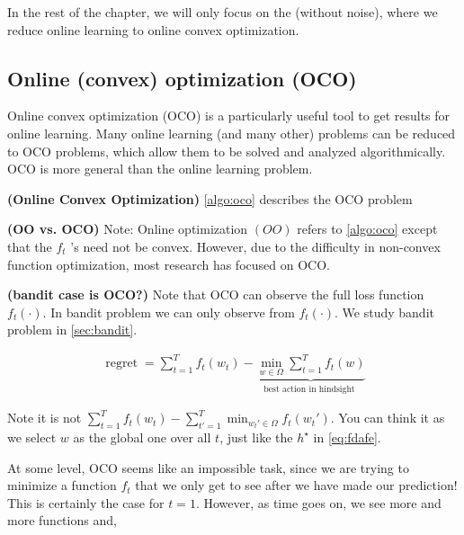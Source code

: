 \documentclass{article}
\newcommand{\bfs}[1]{\textbf{({#1}) }}
\newcommand{\re}{\operatorname{regret}}
\begin{document}
In the rest of the chapter, we will only focus on the  (without noise), where we reduce online learning to online convex optimization.
\subsection{Online (convex) optimization (OCO)}
Online convex optimization (OCO) is a particularly useful tool to get results for online learning. Many online learning (and many other) problems can be reduced to OCO problems, which allow them to be solved and analyzed algorithmically.  OCO is more general than the online learning problem. 
\begin{defa}\bfs{Online Convex Optimization}
\cref{algo:oco} describes the OCO problem
\end{defa}

\begin{rema}\bfs{OO vs. OCO}
Note: Online optimization $(O O)$ refers to \cref{algo:oco} except that the $f_{t}$ 's need not be convex. However, due to the difficulty in non-convex function optimization, most research has focused on OCO.
\end{rema}
\begin{rema}\bfs{bandit case is OCO?}
Note that OCO can observe the full  loss function $f_{t}(\cdot) .$  In bandit  problem we can only observe  from $f_{t}(\cdot)$. We study bandit problem in \cref{sec:bandit}.
\end{rema}
\begin{align*}
\re=\sum_{t=1}^{T} f_{t}\left(w_{t}\right)-\underbrace{\min _{w \in \Omega} \sum_{t=1}^{T} f_{t}(w)}_{\text {best action in hindsight }}
\end{align*}
\begin{rema}
Note it is not $\sum_{t=1}^{T} f_{t}\left(w_{t}\right)- \sum_{t'=1}^{T} \min _{w_t' \in \Omega} f_{t}(w_t')$. You can think it as we select $w $ as the global one  over all $t$, just like the $h^{\star}$ in \cref{eq:fdafe}.
\end{rema}
\begin{rema}
At some level, OCO seems like an impossible task, since we are trying to minimize a function $f_{t}$ that we only get to see after we have made our prediction! This is certainly the case for $t=1$. However, as time goes on, we see more and more functions and, 
\end{rema}
\end{document}
